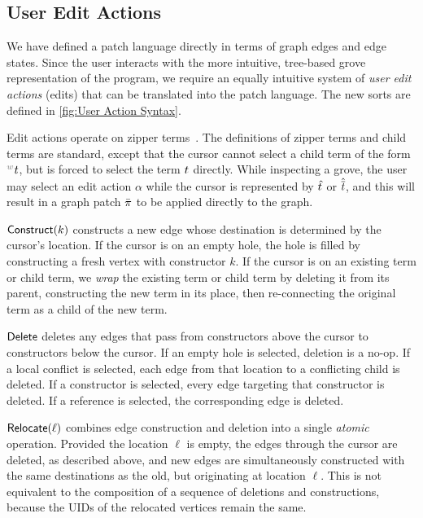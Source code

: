 \figureUserActionSyntax

\subsection{User Edit Actions}%
\label{sub:User Actions}

We have defined a patch language directly in terms of graph edges and edge states. Since the user interacts with the more intuitive, tree-based grove representation of the program, we require an equally intuitive system of \textit{user edit actions} (edits) that can be translated into the patch language. The new sorts are defined in \autoref{fig:User Action Syntax}.

Edit actions operate on zipper terms~\cite{DBLP:journals/jfp/Huet97,DBLP:conf/popl/OmarVHAH17}. The definitions of zipper terms and child terms are standard, except that the cursor cannot select a child term of the form $\eid{w}{}\termMV$, but is forced to select the term $t$ directly. While inspecting a grove, the user may select an edit action $\alpha$ while the cursor is represented by $\hat{t}$ or $\hat{\overline{t}}$, and this will result in a graph patch $\bar{\pi}$ to be applied directly to the  graph.

$\mathsf{Construct}\mathopen{}\left(k\right)\mathclose{}$ constructs a new edge whose destination is determined by the cursor's location. If the cursor is on an empty hole, the hole is filled by constructing a fresh vertex with constructor $k$. If the cursor is on an existing term or child term, we \emph{wrap} the existing term or child term by deleting it from its parent, constructing the new term in its place, then re-connecting the original term as a child of the new term.

$\mathsf{Delete}$ deletes any edges that pass from constructors above the cursor to constructors below the cursor. If an empty hole is selected, deletion is a no-op. If a local conflict is selected, each edge from that location to a conflicting child is deleted. If a constructor is selected, every edge targeting that constructor is deleted. If a reference is selected, the corresponding edge is deleted. 

$\mathsf{Relocate}\mathopen{}\left(\ell\right)\mathclose{}$ combines edge construction and deletion into a single \emph{atomic} operation. Provided the location $\ell$ is empty, the edges through the cursor are deleted, as described above, and new edges are simultaneously constructed with the same destinations as the old, but originating at location $\ell$. This is not equivalent to the composition of a sequence of deletions and constructions, because the UIDs of the relocated vertices remain the same. 

